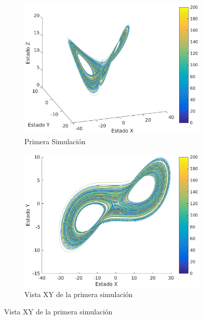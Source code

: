 \documentclass[12pt,letterpaper]{article}
\begin{document}
\begin{figure}
	\centering
	\begin{subfigure}[t]{0.36\textwidth}
		\includegraphics[width=\textwidth]{pictures/primera_simulacion}
		\caption{Primera Simulación}
		\label{fig:simulacion1}
	\end{subfigure}
	\begin{subfigure}[t]{0.36\textwidth}
		\includegraphics[width=\textwidth]{pictures/primera_simulacion_xy}
		\caption{Vista XY de la primera simulación}
		\label{fig:simulacion1xy}
	\end{subfigure}

\end{figure}
\end{document}

